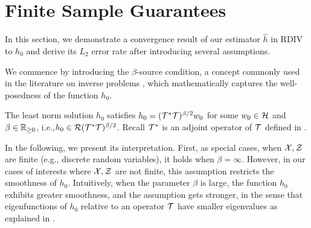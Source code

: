 \vspace{-2mm}
\section{Finite Sample Guarantees}\label{sec: finite-sample}
\vspace{-2mm}

In this section, we demonstrate a convergence result of our estimator $\hat{h}$ in RDIV to $h_0$ and derive its $L_2$ error rate after introducing several assumptions. 

We commence by introducing the $\beta$-source condition, a concept commonly used in the literature on inverse problems \citep{carrasco2007linear,ito2014inverse,engl1996regularization,bennett2023source,liao2021instrumental}, which mathematically captures the well-posedness of the function $h_0$.
\begin{assumption}\label{ass:source-cond}
The least norm solution $h_0$ satisfies $ h_0 = ({\mathcal{T}}^*{\mathcal{T}})^{\beta/2}w_0$ for some $w_0\in {\mathcal{H}}$ and $\beta \in \mathbb{R}_{\geq 0}$, i.e.,$h_0 \in \mathcal{R}({\mathcal{T}}^*{\mathcal{T}} )^{\beta/2}$. Recall ${\mathcal{T}}^*$ is an adjoint operator of ${\mathcal{T}}$ defined in . 
\end{assumption}

In the following, we present its interpretation. First, as special cases, when $\mathcal{X},\mathcal{Z}$ are finite (e.g., discrete random variables), it holds when $\beta=\infty$. However, in our cases of interests where $\mathcal{X},\mathcal{Z}$ are not finite, this assumption restricts the smoothness of $h_0$. 
Intuitively, when the parameter $\beta$ is large, the function $h_0$ exhibits greater smoothness, and the assumption gets stronger, in the sense that eigenfunctions of $h_0$ relative to an operator ${\mathcal{T}}$ have smaller eigenvalues as explained in \citet[Section 6.4]{bennett2023minimax}.   

